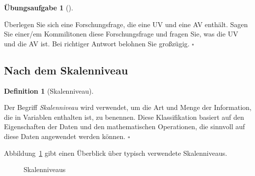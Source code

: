 \documentclass[
  a4paper,
  DIV=11]{scrreprt}
\theoremstyle{definition}
\newtheorem{exercise}{Übungsaufgabe}[chapter]
\theoremstyle{definition}
\theoremstyle{definition}
\newtheorem{definition}{Definition}[chapter]
\theoremstyle{remark}
\begin{document}
\begin{exercise}[]\protect\hypertarget{exr-uvav}{}\label{exr-uvav}

Überlegen Sie sich eine Forschungsfrage, die eine UV und eine AV
enthält. Sagen Sie einer/em Kommilitonen diese Forschungsfrage und
fragen Sie, was die UV und die AV ist. Bei richtiger Antwort belohnen
Sie großzügig. \(\square\)

\end{exercise}

\subsection{Nach dem Skalenniveau}\label{nach-dem-skalenniveau}

\begin{definition}[Skalenniveau]\protect\hypertarget{def-skalenniveau}{}\label{def-skalenniveau}

Der Begriff \emph{Skalenniveau} wird verwendet, um die Art und Menge der
Information, die in Variablen enthalten ist, zu benennen. Diese
Klassifikation basiert auf den Eigenschaften der Daten und den
mathematischen Operationen, die sinnvoll auf diese Daten angewendet
werden können. \(\square\)

\end{definition}

Abbildung~\ref{fig-skalenniveau} gibt einen Überblick über typisch
verwendete Skalenniveaus.

\begin{figure}


\caption{\label{fig-skalenniveau}Skalenniveaus}

\end{figure}%
\end{document}
